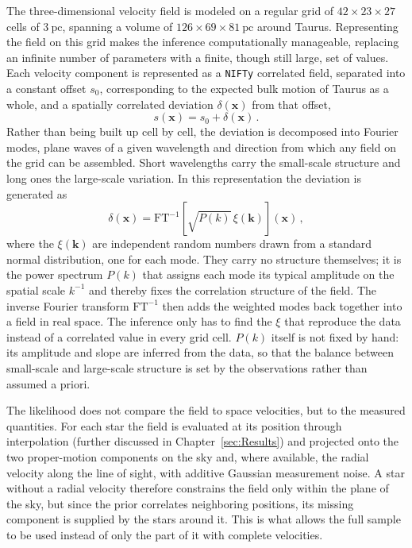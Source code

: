 The three-dimensional velocity field is modeled on a regular grid of $42 \times 23 \times 27$
cells of $3~\mathrm{pc}$, spanning a volume of $126 \times 69 \times 81~\mathrm{pc}$ around Taurus.
Representing the field on this grid makes the inference computationally manageable, replacing an infinite
number of parameters with a finite, though still large, set of values. Each
velocity component is represented as a \texttt{NIFTy} correlated field, separated
into a constant offset $s_0$, corresponding to the expected bulk motion of Taurus as a
whole, and a spatially correlated deviation $\delta(\mathbf{x})$ from that offset,
\begin{equation}
    s(\mathbf{x}) = s_0 + \delta(\mathbf{x}) \, .
    \label{eq:correlatedfield}
\end{equation}
Rather than being built up cell by cell, the deviation is decomposed into Fourier modes,
plane waves of a given wavelength and direction from which any field on the grid can be
assembled. Short wavelengths carry the small-scale structure and long ones the large-scale
variation. In this
representation the deviation is generated as
\begin{equation}
    \delta(\mathbf{x}) = \mathrm{FT}^{-1}\!\left[\sqrt{P(k)}\,\xi(\mathbf{k})\right]\!(\mathbf{x}) \, ,
    \label{eq:deviation}
\end{equation}
where the $\xi(\mathbf{k})$ are independent random numbers drawn from a standard normal
distribution, one for each mode. They carry no structure themselves; it is the power spectrum
$P(k)$ that assigns each mode its typical amplitude on the spatial scale $k^{-1}$ and thereby fixes
the correlation structure of the field. The inverse
Fourier transform $\mathrm{FT}^{-1}$ then adds the weighted modes back together into a field in
real space.
The inference only has to find the $\xi$ that reproduce the
data instead of a correlated value in every grid cell. $P(k)$ itself is not fixed by hand: its
amplitude and slope are inferred from the data, so that the balance between small-scale and
large-scale structure is set by the observations rather than assumed a priori.

The likelihood does not compare the field to space velocities, but to the measured quantities.
For each star the field is evaluated at its position through interpolation
(further discussed in Chapter~\ref{sec:Results}) and projected onto the two proper-motion
components on the sky and, where available, the radial velocity along the line of sight, with
additive Gaussian measurement noise.
A star without a
radial velocity therefore constrains the field only within the plane of the sky, but since the
prior correlates neighboring positions, its missing component is supplied by the stars around
it. This is what allows the full sample to be used instead of only the part of it with
complete velocities.


